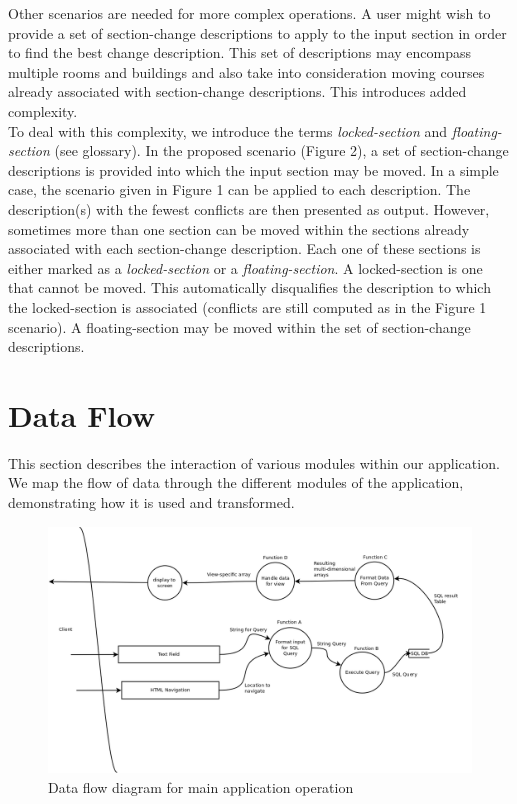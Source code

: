 \documentclass[11pt]{article}
\begin{document}
Other scenarios are needed for more complex operations. A user might wish to provide a set of section-change descriptions to apply to
the input section in order to find the best change description. This set of descriptions may encompass multiple rooms and buildings and also
take into consideration moving courses already associated with section-change descriptions. This introduces added complexity. \\

To deal with this complexity, we introduce the terms \textit{locked-section} and \textit{floating-section} (see glossary). In the proposed
scenario (Figure 2), a set of section-change descriptions is provided into which the input section may be moved. In a simple case, the scenario
given in Figure 1 can be applied to each description. The description(s) with the fewest conflicts are then presented as output. However, sometimes
more than one section can be moved within the sections already associated with each section-change description. Each one of these sections is either marked
as a \textit{locked-section} or a \textit{floating-section}. A locked-section is one that cannot be moved. This automatically disqualifies the description to
which the locked-section is associated (conflicts are still computed as in the Figure 1 scenario). A floating-section may be moved within the set of 
section-change descriptions.

\pagebreak[4]

\section{Data Flow} \label{sec:dataflow}

This section describes the interaction of various modules within our application. We map the flow of data through the different
modules of the application, demonstrating how it is used and transformed.

\begin{figure}[h]
  \centering
  \includegraphics[width=1\textwidth,scale=1.5]{diagrams/dataflow.png}
  \caption{Data flow diagram for main application operation}
\end{figure}
\end{document}
